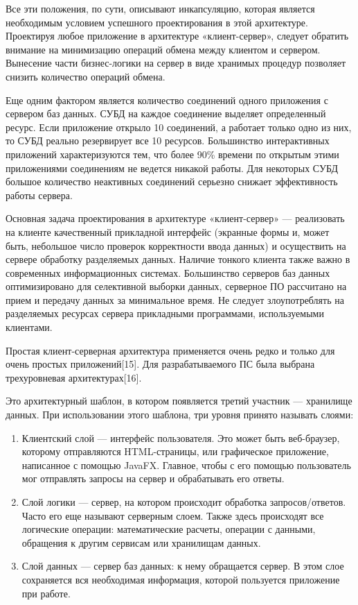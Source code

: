 Все эти положения, по сути, описывают инкапсуляцию, которая является необходимым условием успешного проектирования в этой архитектуре.
Проектируя любое приложение в архитектуре «клиент-сервер», следует обратить внимание на минимизацию операций обмена между клиентом и сервером.
Вынесение части бизнес-логики на сервер в виде хранимых процедур позволяет снизить количество операций обмена.

Еще одним фактором является количество соединений одного приложения с сервером баз данных.
СУБД на каждое соединение выделяет определенный ресурс.
Если приложение открыло 10 соединений, а работает только одно из них, то СУБД реально резервирует все 10 ресурсов.
Большинство интерактивных приложений характеризуются тем, что более 90\% времени по открытым этими приложениями соединениям не ведется никакой работы.
Для некоторых СУБД большое количество неактивных соединений серьезно снижает эффективность работы сервера.

Основная задача проектирования в архитектуре «клиент-сервер» — реализовать на клиенте качественный прикладной интерфейс (экранные формы и, может быть, небольшое число проверок корректности ввода данных) и осуществить на сервере обработку разделяемых данных.
Наличие тонкого клиента также важно в современных информационных системах.
Большинство серверов баз данных оптимизировано для селективной выборки данных, серверное ПО рассчитано на прием и передачу данных за минимальное время.
Не следует злоупотреблять на разделяемых ресурсах сервера прикладными программами, используемыми клиентами.

Простая клиент-серверная архитектура применяется очень редко и только для очень простых приложений[15].
Для разрабатываемого ПС была выбрана трехуровневая архитектурах[16].

Это архитектурный шаблон, в котором появляется третий участник — хранилище данных.
При использовании этого шаблона, три уровня принято называть слоями:
\begin{enumerate}
    \item Клиентский слой — интерфейс пользователя.
    Это может быть веб-браузер, которому отправляются HTML-страницы, или графическое приложение, написанное с помощью JavaFX.
    Главное, чтобы с его помощью пользователь мог отправлять запросы на сервер и обрабатывать его ответы.
    \item Слой логики — сервер, на котором происходит обработка запросов/ответов.
    Часто его еще называют серверным слоем.
    Также здесь происходят все логические операции: математические расчеты, операции с данными, обращения к другим сервисам или хранилищам данных.
    \item Слой данных — сервер баз данных: к нему обращается сервер.
    В этом слое сохраняется вся необходимая информация, которой пользуется приложение при работе.
\end{enumerate}

